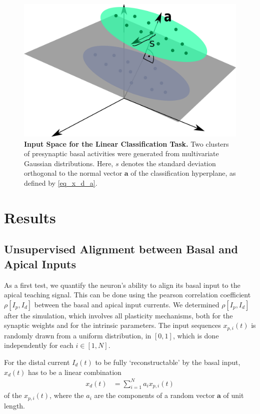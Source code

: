 \documentclass[utf8]{frontiersSCNS} %
\begin{document}
\begin{figure}[t]
\centering
\includegraphics[width=0.55\columnwidth]{illustration_classification}
\caption{{\bf Input Space for the Linear Classification Task.}
Two clusters of presynaptic basal activities were generated from 
multivariate Gaussian distributions. Here, $s$ denotes the standard
deviation orthogonal to the normal vector $\mathbf{a}$ of the 
classification hyperplane, as defined by \eqref{eq_x_d_a}.}
\label{fig_illustration_classification}
\end{figure}

\section{Results}
\label{sect:results}

\subsection{Unsupervised Alignment between Basal and Apical Inputs}
\label{sect:alignment}

As a first test, we quantify the neuron's ability to 
align its basal input to the apical teaching signal.
This can be done using the pearson correlation coefficient
$\rho[I_p,I_d]$ between the basal and 
apical input currents. We determined 
$\rho[I_p,I_d]$ after the simulation,
which involves all plasticity mechanisms, both
for the synaptic weights and for the intrinsic 
parameters. The input sequences $x_{p,i}(t)$ 
is randomly drawn from a uniform distribution,
in $[0,1]$, which is done independently for 
each $i\in[1,N]$.

For the distal current $I_d(t)$ to be fully 
`reconstructable' by the basal input, $x_d(t)$ has 
to be a linear combination 
\begin{align}
x_d(t) &= \sum_{i=1}^N a_i x_{p,i}(t)
\label{eq_x_d_a}
\end{align}
of the $x_{p,i}(t)$, where the $a_i$ are the
components of a random vector $\mathbf{a}$ 
of unit length. 
\end{document}
